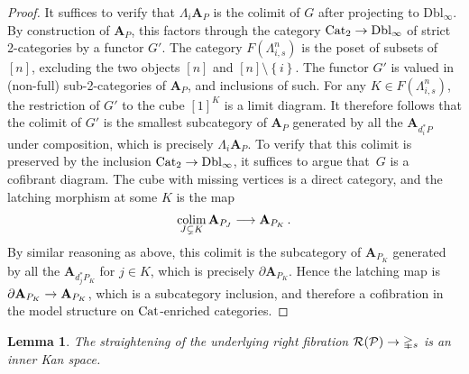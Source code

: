 \documentclass[10pt]{amsart}
\numberwithin{equation}{section}
\newtheorem{lem}[prop]{Lemma}
\theoremstyle{definition}
\DeclareMathOperator*{\colim}{colim}
\newcommand{\Cat}{\mathrm{Cat}\vphantom{t}}
\newcommand{\Simp}{\mathbb{\Delta}}
\newcommand{\Horn}{\Lambda}
\newcommand{\cP}{\mathcal{P}}
\newcommand{\cR}{\mathcal{R}}
\newcommand{\bfA}{\mathbf{A}}
\newcommand{\Dbl}{\mathrm{Dbl}}
\newcommand{\del}{\partial}
\renewcommand{\to}{\mathchoice{\longrightarrow}{\rightarrow}{}{}}
\begin{document}
\begin{proof}
	It suffices to verify that $\Horn_{i}\bfA_{P}$ is the colimit of $G$ after projecting to $\Dbl_{\infty}$.
  By construction of $\bfA_{P}$, this factors through the category $\Cat_{2} \to \Dbl_{\infty}$ of strict 2-categories by a functor $G'$.
  The category $F(\Horn^{n}_{i,s})$ is the poset of subsets of $[n]$, excluding the two objects $[n]$ and $[n]\setminus \left\{ i\right\}$.
  The functor $G'$ is valued in (non-full) sub-2-categories of $\bfA_{P}$, and inclusions of such.
  For any $K\in F(\Horn^{n}_{i,s})$, the restriction of $G'$ to the cube $[1]^{K}$ is a limit diagram.
  It therefore follows that the colimit of $G'$ is the smallest subcategory of $\bfA_{P}$ generated by all the $\bfA_{d_{i}^{*}P}$ under composition, which is precisely $\Horn_{i}\bfA_{P}$.
  To verify that this colimit is preserved by the inclusion $\Cat_{2} \to \Dbl_{\infty}$, it suffices to argue that~$G$ is a cofibrant diagram.
  The cube with missing vertices is a direct category, and the latching morphism at some $K$ is the map
	\begin{align*}
		\colim_{J\subsetneq K} \bfA_{P_{J}} \to \bfA_{P_{K}} \,.
	\end{align*}
	By similar reasoning as above, this colimit is the subcategory of $\bfA_{P_{K}}$ generated by all the $\bfA_{d_{j}^{*}P_{K}}$ for $j\in K$, which is precisely $\del \bfA_{P_{K}}$.
  Hence the latching map is $\del \bfA_{P_{K}} \to \bfA_{P_{K}}$, which is a subcategory inclusion, and therefore a cofibration in the model structure on $\Cat$-enriched categories.
\end{proof}

\begin{lem}\label{lem:St(P)_inner_Kan}
	The straightening of the underlying right fibration $\cR(\cP) \to \Simp_{s}$ is an inner Kan space.
\end{lem}
\end{document}
